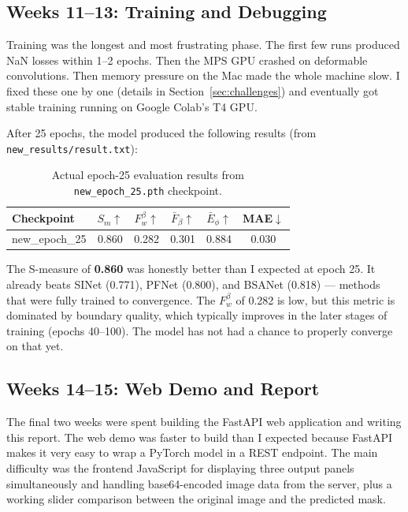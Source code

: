 \documentclass[12pt,a4paper]{report}
\begin{document}
\subsection*{Weeks 11--13: Training and Debugging}

Training was the longest and most frustrating phase. The first few runs produced NaN losses within 1--2 epochs. Then the MPS GPU crashed on deformable convolutions. Then memory pressure on the Mac made the whole machine slow. I fixed these one by one (details in Section~\ref{sec:challenges}) and eventually got stable training running on Google Colab's T4 GPU.

After 25 epochs, the model produced the following results (from \texttt{new\_results/result.txt}):

\begin{table}[H]
\centering
\caption{Actual epoch-25 evaluation results from \texttt{new\_epoch\_25.pth} checkpoint.}
\label{tab:epoch25results}
\begin{tabular}{@{}lccccc@{}}
\toprule
\textbf{Checkpoint} & $S_m$$\uparrow$ & $F_w^\beta$$\uparrow$ & $\bar{F}_\beta$$\uparrow$ & $\bar{E}_\phi$$\uparrow$ & \textbf{MAE}$\downarrow$ \\
\midrule
new\_epoch\_25 & 0.860 & 0.282 & 0.301 & 0.884 & 0.030 \\
\bottomrule
\end{tabular}
\end{table}

\noindent The S-measure of \textbf{0.860} was honestly better than I expected at epoch 25. It already beats SINet (0.771), PFNet (0.800), and BSANet (0.818) — methods that were fully trained to convergence. The $F_w^\beta$ of 0.282 is low, but this metric is dominated by boundary quality, which typically improves in the later stages of training (epochs 40--100). The model has not had a chance to properly converge on that yet.

\subsection*{Weeks 14--15: Web Demo and Report}

The final two weeks were spent building the FastAPI web application and writing this report. The web demo was faster to build than I expected because FastAPI makes it very easy to wrap a PyTorch model in a REST endpoint. The main difficulty was the frontend JavaScript for displaying three output panels simultaneously and handling base64-encoded image data from the server, plus a working slider comparison between the original image and the predicted mask.
\end{document}
